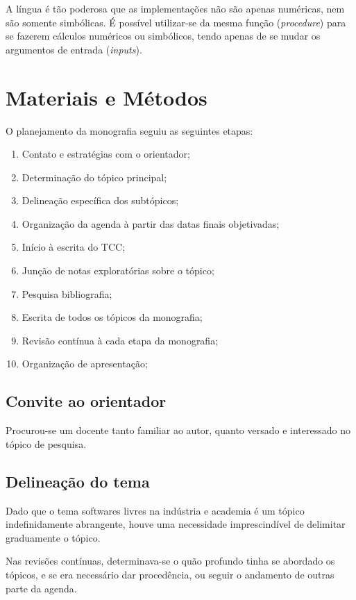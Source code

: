 \documentclass[
12pt,				%
openright,			%
oneside,			%
a4paper,			%
english,			%
french,				%
spanish,			%
brazil,				%
]{abntex2}
\begin{document}
A língua é tão poderosa que as implementações não são apenas numéricas, nem são somente simbólicas. É possível utilizar-se da mesma função (\textit{procedure}) para se fazerem cálculos numéricos ou simbólicos, tendo apenas de se mudar os argumentos de entrada (\textit{inputs}).

\clearpage



\chapter{Materiais e Métodos}
O planejamento da monografia seguiu as seguintes etapas:

\begin{enumerate}
\item Contato e estratégias com o orientador;
\item Determinação do tópico principal; 
\item Delineação específica dos subtópicos;
\item Organização da agenda à partir das datas finais objetivadas;
\item Início à escrita do TCC;
\item Junção de notas exploratórias sobre o tópico;
\item Pesquisa bibliografia;
\item Escrita de todos os tópicos da monografia;
\item Revisão contínua à cada etapa da monografia;
\item Organização de apresentação;
\end{enumerate}

\section{Convite ao orientador}
Procurou-se um docente tanto familiar ao autor, quanto versado e
interessado no tópico de pesquisa.

\section{Delineação do tema}
Dado que o tema softwares livres na indústria e academia é um tópico
indefinidamente abrangente, houve uma necessidade imprescindível de
delimitar graduamente o tópico.

Nas revisões contínuas, determinava-se o quão profundo tinha se
abordado os tópicos, e se era necessário dar procedência, ou seguir o
andamento de outras parte da agenda.
\end{document}
